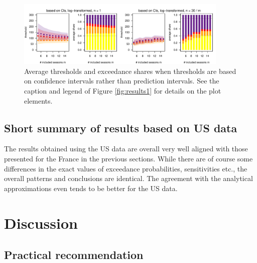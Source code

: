 \documentclass{article}
\begin{document}
\begin{figure}[h!]
\begin{center}
\includegraphics[width=0.9\textwidth]{figure/plot_ci_fr.pdf}
\end{center}
\caption{Average thresholds and exceedance shares when thresholds are based on confidence intervals rather than prediction intervals. See the caption and legend of Figure \ref{fig:results1} for details on the plot elements.}
\label{fig:cis}
\end{figure}

\subsection{Short summary of results based on US data}
\label{subsec:results_us}

The results obtained using the US data are overall very well aligned with those presented for the France in the previous sections. While there are of course some differences in the exact values of exceedance probabilities, sensitivities etc., the overall patterns and conclusions are identical. The agreement with the analytical approximations even tends to be better for the US data. %

\section{Discussion}
\label{sec:discussion}

\subsection{Practical recommendation}
\end{document}
